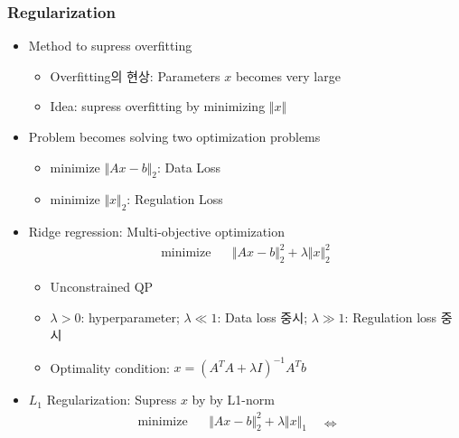 \subsubsection*{Regularization}
\begin{itemize}
    \item Method to supress overfitting
    \begin{itemize}
        \item Overfitting의 현상: Parameters $x$ becomes very large
        \item Idea: supress overfitting by minimizing $\Vert x\Vert$
    \end{itemize}
    \item Problem becomes solving two optimization problems
    \begin{itemize}
        \item minimize $\Vert Ax-b\Vert_2$: Data Loss
        \item minimize $\Vert x\Vert_2$: Regulation Loss
    \end{itemize}
    \item Ridge regression: Multi-objective optimization
    \begin{equation}\begin{aligned}
        \mathrm{minimize}~~&~~\Vert Ax-b\Vert_2^2+\lambda\Vert x\Vert_2^2
    \end{aligned}\end{equation}
    \begin{itemize}
        \item Unconstrained QP
        \item $\lambda>0$: hyperparameter; $\lambda\ll1$: Data loss 중시; $\lambda\gg1$: Regulation loss 중시
        \item Optimality condition: $x=\left(A^TA+\lambda I\right)^{-1}A^Tb$
    \end{itemize}
    \begin{figures}
    \end{figures}
    \newpage
    \item $L_1$ Regularization: Supress $x$ by by L1-norm
    \begin{equation}\begin{aligned}
        \mathrm{minimize}~~&~~\Vert Ax-b\Vert_2^2+\lambda\Vert x\Vert_1 \\ {}
    \end{aligned}~~~\Leftrightarrow~~~\begin{aligned}

\end{aligned}
\end{equation}
\end{itemize}
